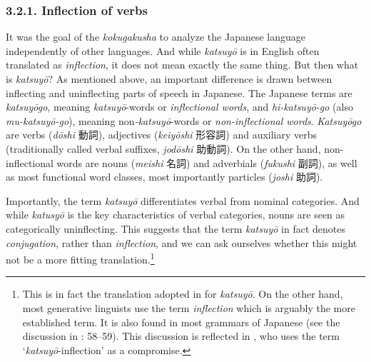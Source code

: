 \documentclass[output=paper]{langscibook}
\begin{document}
\subsubsection{3.2.1. Inflection of verbs}

It was the goal of the \textit{kokugakusha} to analyze the Japanese language independently of other languages. And while \textit{katsuyō} is in English often translated as \textit{inflection}, it does not mean exactly the same thing. But then what is \textit{katsuyō}? As mentioned above, an important difference is drawn between inflecting and uninflecting parts of speech in Japanese. The Japanese terms are \textit{katsuyōgo}, meaning \textit{katsuyō}{}-words or \textit{inflectional words}, and \textit{hi-katsuyō-go} (also \textit{mu-katsuyō-go}), meaning non\textit{{}-katsuyō}{}-words or \textit{non-inflectional words}. \textit{Katsuyōgo} are verbs (\textit{dōshi} 動詞), adjectives (\textit{keiyōshi} 形容詞) and auxiliary verbs (traditionally called verbal suffixes, \textit{jodōshi}\textbf{ }助動詞). On the other hand, non-inflectional words are nouns (\textit{meishi} 名詞) and adverbials (\textit{fukushi} 副詞), as well as most functional word classes, most importantly particles (\textit{joshi} 助詞).

Importantly, the term \textit{katsuyō} differentiates verbal from nominal categories. And while \textit{katusyō} is the key characteristics of verbal categories, nouns are seen as categorically uninflecting. This suggests that the term \textit{katsuyō} in fact denotes \textit{conjugation}, rather than \textit{inflection}, and we can ask ourselves whether this might not be a more fitting translation.\footnote{This is in fact the translation adopted in \citet{Martin1975} for \textit{katsuyō}. On the other hand, most generative linguists use the term \textit{inflection} which is arguably the more established term. It is also found in most grammars of Japanese (see the discussion in \citealt{Uehara1998}: 58–59). This discussion is reflected in \citet{Uehara1998}, who uses the term ‘\textit{katsuyō}{}-inflection’ as a compromise.}
\end{document}
